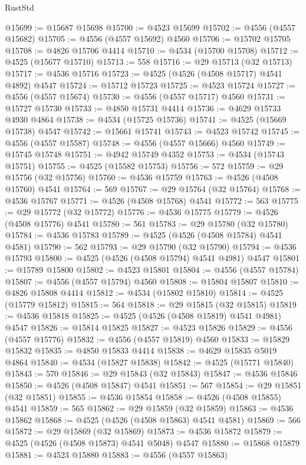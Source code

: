 \begin{lexlean}{RustStd}
\begin{coremodule}
{\begin{coremodule}
{{{{{{{{{{{{{{{{{{{{{{{{{{{{{{{{{{{{{{{{{{{{{{{{{{{{{{{@15699 := @15687 @15698
@15700 := @4523 @15699
@15702 := @4556 (@4557 @15682)
@15705 := @4556 (@4557 @15692) @4560
@15706 := @15702 @15705
@15708 := @4826 @15706 @4414
@15710 := @4534 (@15700 @15708)
@15712 := @4525 (@15677 @15710)
@15713 := 558
@15716 := @29 @15713 (@32 @15713)
@15717 := @4536 @15716
@15723 := @4525 (@4526 (@4508 @15717) @4541 @4892) @4547
@15724 := @15712 @15723
@15725 := @4523 @15724
@15727 := @4556 (@4557 @15674)
@15730 := @4556 (@4557 @15717) @4560
@15731 := @15727 @15730
@15733 := @4850 @15731 @4414
@15736 := @4629 @15733 @4930 @4864
@15738 := @4534 (@15725 @15736)
@15741 := @4525 (@15669 @15738) @4547
@15742 := @15661 @15741
@15743 := @4523 @15742
@15745 := @4556 (@4557 @15587)
@15748 := @4556 (@4557 @15666) @4560
@15749 := @15745 @15748
@15751 := @4942 @15749 @4352
@15753 := @4534 (@15743 @15751)
@15755 := @4525 (@15582 @15753)
@15756 := 572
@15759 := @29 @15756 (@32 @15756)
@15760 := @4536 @15759
@15763 := @4526 (@4508 @15760) @4541
@15764 := 569
@15767 := @29 @15764 (@32 @15764)
@15768 := @4536 @15767
@15771 := @4526 (@4508 @15768) @4541
@15772 := 563
@15775 := @29 @15772 (@32 @15772)
@15776 := @4536 @15775
@15779 := @4526 (@4508 @15776) @4541
@15780 := 561
@15783 := @29 @15780 (@32 @15780)
@15784 := @4536 @15783
@15789 := @4525 (@4526 (@4508 @15784) @4541 @4581)
@15790 := 562
@15793 := @29 @15790 (@32 @15790)
@15794 := @4536 @15793
@15800 := @4525 (@4526 (@4508 @15794) @4541 @4981) @4547
@15801 := @15789 @15800
@15802 := @4523 @15801
@15804 := @4556 (@4557 @15784)
@15807 := @4556 (@4557 @15794) @4560
@15808 := @15804 @15807
@15810 := @4826 @15808 @4414
@15812 := @4534 (@15802 @15810)
@15814 := @4525 (@15779 @15812)
@15815 := 564
@15818 := @29 @15815 (@32 @15815)
@15819 := @4536 @15818
@15825 := @4525 (@4526 (@4508 @15819) @4541 @4981) @4547
@15826 := @15814 @15825
@15827 := @4523 @15826
@15829 := @4556 (@4557 @15776)
@15832 := @4556 (@4557 @15819) @4560
@15833 := @15829 @15832
@15835 := @4850 @15833 @4414
@15838 := @4629 @15835 @5019 @4864
@15840 := @4534 (@15827 @15838)
@15842 := @4525 (@15771 @15840)
@15843 := 570
@15846 := @29 @15843 (@32 @15843)
@15847 := @4536 @15846
@15850 := @4526 (@4508 @15847) @4541
@15851 := 567
@15854 := @29 @15851 (@32 @15851)
@15855 := @4536 @15854
@15858 := @4526 (@4508 @15855) @4541
@15859 := 565
@15862 := @29 @15859 (@32 @15859)
@15863 := @4536 @15862
@15868 := @4525 (@4526 (@4508 @15863) @4541 @4581)
@15869 := 566
@15872 := @29 @15869 (@32 @15869)
@15873 := @4536 @15872
@15879 := @4525 (@4526 (@4508 @15873) @4541 @5048) @4547
@15880 := @15868 @15879
@15881 := @4523 @15880
@15883 := @4556 (@4557 @15863)
}}}}}}}}}}}}}}}}}}}}}}}}}}}}}}}}}}}}}}}}}}}}}}}}}}}}}}}
\end{coremodule}}
\end{coremodule}
\end{lexlean}
